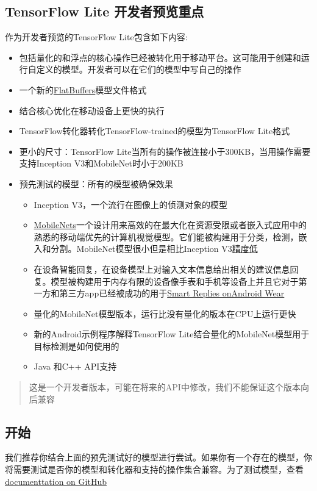 \subsection{TensorFlow Lite 开发者预览重点}
作为开发者预览的TensorFlow Lite包含如下内容:
\begin{itemize}
\item 包括量化的和浮点的核心操作已经被转化用于移动平台。这可能用于创建和运行自定义的模型。开发者可以在它们的模型中写自己的操作
\item 一个新的\href{https://google.github.io/flatbuffers/}{FlatBuffers}模型文件格式
\item 结合核心优化在移动设备上更快的执行
\item TensorFlow转化器转化TensorFlow-trained的模型为TensorFlow Lite格式
\item 更小的尺寸：TensorFlow Lite当所有的操作被连接小于300KB，当用操作需要支持Inception V3和MobileNet时小于200KB
\item 预先测试的模型：所有的模型被确保效果\begin{itemize}
\item Inception V3，一个流行在图像上的侦测对象的模型
\item \href{https://github.com/tensorflow/models/blob/master/research/slim/nets/mobilenet_v1.md}{MobileNets}一个设计用来高效的在最大化在资源受限或者嵌入式应用中的熟悉的移动端优先的计算机视觉模型。它们能被构建用于分类，检测，嵌入和分割。MobileNet模型很小但是相比Inception V3\href{https://research.googleblog.com/2017/06/mobilenets-open-source-models-for.html}{精度低}
\item 在设备智能回复，在设备模型上对输入文本信息给出相关的建议信息回复。模型被构建用于内存有限的设备像手表和手机等设备上并且它对于第一方和第三方app已经被成功的用于\href{https://research.googleblog.com/2017/02/on-device-machine-intelligence.html}{Smart Replies onAndroid Wear}
\item 量化的MobileNet模型版本，运行比没有量化的版本在CPU上运行更快
\item 新的Android示例程序解释TensorFlow Lite结合量化的MobileNet模型用于目标检测是如何使用的
\item Java 和C++ API支持
\end{itemize}
\end{itemize}
\begin{quote}
这是一个开发者版本，可能在将来的API中修改，我们不能保证这个版本向后兼容
\end{quote}
\subsection{开始}
我们推荐你结合上面的预先测试好的模型进行尝试。如果你有一个存在的模型，你将需要测试是否你的模型和转化器和支持的操作集合兼容。为了测试模型，查看\href{https://github.com/tensorflow/tensorflow/tree/master/tensorflow/contrib/lite}{documenttation on GitHub}
